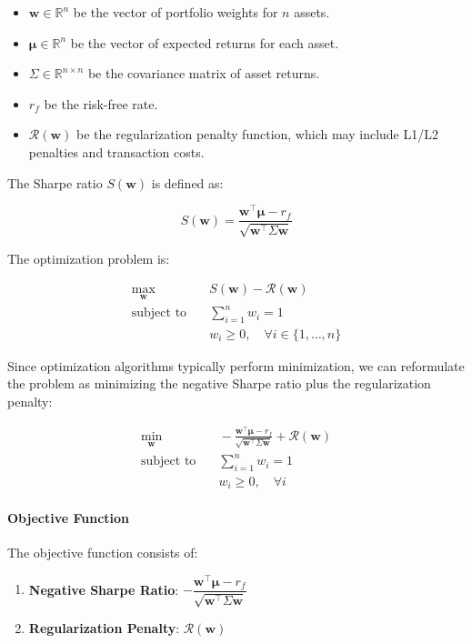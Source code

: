 \begin{itemize}
    \item \( \mathbf{w} \in \mathbb{R}^n \) be the vector of portfolio weights for \( n \) assets.
    \item \( \boldsymbol{\mu} \in \mathbb{R}^n \) be the vector of expected returns for each asset.
    \item \( \Sigma \in \mathbb{R}^{n \times n} \) be the covariance matrix of asset returns.
    \item \( r_f \) be the risk-free rate.
    \item \( \mathcal{R}(\mathbf{w}) \) be the regularization penalty function, which may include L1/L2 penalties and transaction costs.
\end{itemize}

The Sharpe ratio \( S(\mathbf{w}) \) is defined as:

\[
S(\mathbf{w}) = \frac{\mathbf{w}^\top \boldsymbol{\mu} - r_f}{\sqrt{\mathbf{w}^\top \Sigma \mathbf{w}}}
\]

The optimization problem is:

\[
\begin{aligned}
\max_{\mathbf{w}} & \quad S(\mathbf{w}) - \mathcal{R}(\mathbf{w}) \\
\text{subject to} & \quad \sum_{i=1}^n w_i = 1 \\
& \quad w_i \geq 0, \quad \forall i \in \{1, \dots, n\}
\end{aligned}
\]

Since optimization algorithms typically perform minimization, we can reformulate the problem as minimizing the negative Sharpe ratio plus the regularization penalty:

\[
\begin{aligned}
\min_{\mathbf{w}} & \quad -\frac{\mathbf{w}^\top \boldsymbol{\mu} - r_f}{\sqrt{\mathbf{w}^\top \Sigma \mathbf{w}}} + \mathcal{R}(\mathbf{w}) \\
\text{subject to} & \quad \sum_{i=1}^n w_i = 1 \\
& \quad w_i \geq 0, \quad \forall i
\end{aligned}
\]

\paragraph{Objective Function}

The objective function consists of:

\begin{enumerate}
    \item \textbf{Negative Sharpe Ratio}: \( -\dfrac{\mathbf{w}^\top \boldsymbol{\mu} - r_f}{\sqrt{\mathbf{w}^\top \Sigma \mathbf{w}}} \)
    \item \textbf{Regularization Penalty}: \( \mathcal{R}(\mathbf{w}) \)
\end{enumerate}

